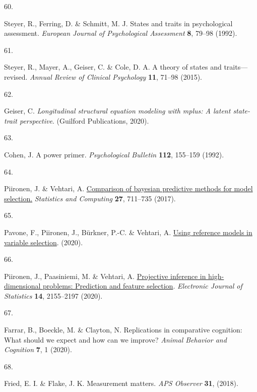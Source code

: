 \documentclass[
  man,floatsintext]{apa6}
\newlength{\cslhangindent}
\newlength{\csllabelwidth}
\newlength{\cslentryspacingunit} %
\newenvironment{CSLReferences}[2] %
 {%
  \setlength{\parindent}{0pt}
  \ifodd #1
  \let\oldpar\par
  \def\par{\hangindent=\cslhangindent\oldpar}
  \fi
  \setlength{\parskip}{#2\cslentryspacingunit}
 }%
 {}
\newcommand{\CSLLeftMargin}[1]{\parbox[t]{\csllabelwidth}{#1}}
\newcommand{\CSLRightInline}[1]{\parbox[t]{\linewidth - \csllabelwidth}{#1}\break}
\begin{document}
\begin{CSLReferences}{0}{0}
\leavevmode{}%
\CSLLeftMargin{60. }%
\CSLRightInline{Steyer, R., Ferring, D. \& Schmitt, M. J. States and traits in psychological assessment. \emph{European Journal of Psychological Assessment} \textbf{8}, 79--98 (1992).}

\leavevmode{}%
\CSLLeftMargin{61. }%
\CSLRightInline{Steyer, R., Mayer, A., Geiser, C. \& Cole, D. A. A theory of states and traits---revised. \emph{Annual Review of Clinical Psychology} \textbf{11}, 71--98 (2015).}

\leavevmode{}%
\CSLLeftMargin{62. }%
\CSLRightInline{Geiser, C. \emph{Longitudinal structural equation modeling with mplus: A latent state-trait perspective}. (Guilford Publications, 2020).}

\leavevmode{}%
\CSLLeftMargin{63. }%
\CSLRightInline{Cohen, J. A power primer. \emph{Psychological Bulletin} \textbf{112}, 155--159 (1992).}

\leavevmode{}%
\CSLLeftMargin{64. }%
\CSLRightInline{Piironen, J. \& Vehtari, A. \href{https://doi.org/10.1007/s11222-016-9649-y}{Comparison of bayesian predictive methods for model selection.} \emph{Statistics and Computing} \textbf{27}, 711--735 (2017).}

\leavevmode{}%
\CSLLeftMargin{65. }%
\CSLRightInline{Pavone, F., Piironen, J., Bürkner, P.-C. \& Vehtari, A. \href{https://arxiv.org/abs/2004.13118}{Using reference models in variable selection}. (2020).}

\leavevmode{}%
\CSLLeftMargin{66. }%
\CSLRightInline{Piironen, J., Paasiniemi, M. \& Vehtari, A. \href{https://doi.org/10.1214/20-EJS1711}{{Projective inference in high-dimensional problems: Prediction and feature selection}}. \emph{Electronic Journal of Statistics} \textbf{14}, 2155--2197 (2020).}

\leavevmode{}%
\CSLLeftMargin{67. }%
\CSLRightInline{Farrar, B., Boeckle, M. \& Clayton, N. Replications in comparative cognition: What should we expect and how can we improve? \emph{Animal Behavior and Cognition} \textbf{7}, 1 (2020).}

\leavevmode{}%
\CSLLeftMargin{68. }%
\CSLRightInline{Fried, E. I. \& Flake, J. K. Measurement matters. \emph{APS Observer} \textbf{31}, (2018).}


\end{CSLReferences}
\end{document}
